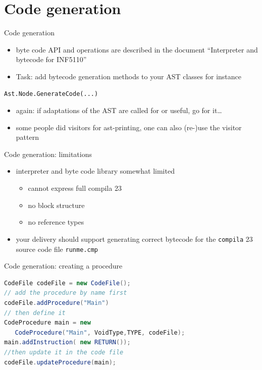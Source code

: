 \documentclass{beamer}
\begin{document}
\section{Code generation}
\label{sec:org9e72424}
\begin{frame}[label={sec:org3aff0e4},fragile]{Code generation}
 \begin{itemize}
\item byte code API and operations are described in the document ``Interpreter
and bytecode for INF5110''

\item \alert{Task:} add bytecode generation methods to your AST classes
for instance
\end{itemize}

\begin{verbatim}
Ast.Node.GenerateCode(...)
\end{verbatim}
\begin{itemize}
\item again: if adaptations of the AST are called for or useful, go for it\ldots{}

\item some people did \alert{visitors} for ast-printing, one can also (re-)use the visitor pattern
\end{itemize}
\end{frame}
\begin{frame}[label={sec:org15e282d},fragile]{Code generation: limitations}
 \begin{itemize}
\item interpreter and byte code library somewhat \alert{limited}
\begin{itemize}
\item cannot express full compila 23
\item no block structure
\item no reference types
\end{itemize}
\end{itemize}


\begin{itemize}
\item your delivery should support generating correct bytecode
for the \texttt{compila} 23 source code file \texttt{runme.cmp}
\end{itemize}
\end{frame}
\begin{frame}[label={sec:org291e1fd},fragile,plain]{Code generation: creating a procedure}
 \begin{lstlisting}[language=java,numbers=none]
CodeFile codeFile = new CodeFile();
// add the procedure by name first
codeFile.addProcedure("Main")
// then define it
CodeProcedure main = new 
   CodeProcedure("Main", VoidType,TYPE, codeFile);
main.addInstruction( new RETURN());
//then update it in the code file
codeFile.updateProcedure(main);
\end{lstlisting}
\end{frame}
\end{document}
